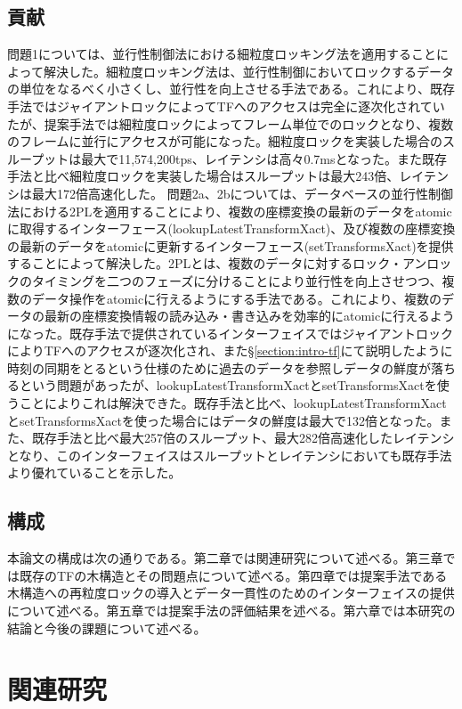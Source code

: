 \documentclass[a4paper]{jreport}	%
\begin{document}
\section{貢献}
問題1については、並行性制御法における細粒度ロッキング法を適用することによって解決した。細粒度ロッキング法は、並行性制御においてロックするデータの単位をなるべく小さくし、並行性を向上させる手法である。これにより、既存手法ではジャイアントロックによってTFへのアクセスは完全に逐次化されていたが、提案手法では細粒度ロックによってフレーム単位でのロックとなり、複数のフレームに並行にアクセスが可能になった。細粒度ロックを実装した場合のスループットは最大で11,574,200tps、レイテンシは高々0.7msとなった。また既存手法と比べ細粒度ロックを実装した場合はスループットは最大243倍、レイテンシは最大172倍高速化した。
問題2a、2bについては、データベースの並行性制御法における2PLを適用することにより、複数の座標変換の最新のデータをatomicに取得するインターフェース(lookupLatestTransformXact)、及び複数の座標変換の最新のデータをatomicに更新するインターフェース(setTransformsXact)を提供することによって解決した。2PLとは、複数のデータに対するロック・アンロックのタイミングを二つのフェーズに分けることにより並行性を向上させつつ、複数のデータ操作をatomicに行えるようにする手法である。これにより、複数のデータの最新の座標変換情報の読み込み・書き込みを効率的にatomicに行えるようになった。既存手法で提供されているインターフェイスではジャイアントロックによりTFへのアクセスが逐次化され、また§\ref{section:intro-tf}にて説明したように時刻の同期をとるという仕様のために過去のデータを参照しデータの鮮度が落ちるという問題があったが、lookupLatestTransformXactとsetTransformsXactを使うことによりこれは解決できた。既存手法と比べ、lookupLatestTransformXactとsetTransformsXactを使った場合にはデータの鮮度は最大で132倍となった。また、既存手法と比べ最大257倍のスループット、最大282倍高速化したレイテンシとなり、このインターフェイスはスループットとレイテンシにおいても既存手法より優れていることを示した。

\section{構成}
本論文の構成は次の通りである。第二章では関連研究について述べる。第三章では既存のTFの木構造とその問題点について述べる。第四章では提案手法である木構造への再粒度ロックの導入とデータ一貫性のためのインターフェイスの提供について述べる。第五章では提案手法の評価結果を述べる。第六章では本研究の結論と今後の課題について述べる。

\chapter{関連研究}
\end{document}
